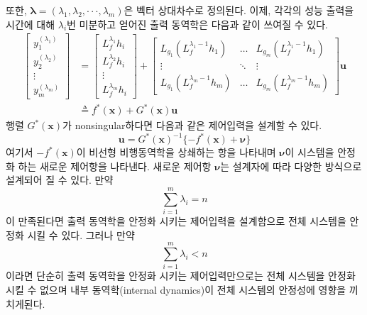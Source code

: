 \documentclass[a4paper, 12pt]{report}
\begin{document}
	또한, $\boldsymbol{\lambda}=(\lambda_{1},\lambda_{2},\cdot\cdot\cdot,\lambda_{m})$은 벡터 상대차수로 정의된다. 이제, 각각의 성능 출력을 시간에 대해 $\lambda_{i}$번 미분하고 얻어진 출력 동역학은 다음과 같이 쓰여질 수 있다.
	\begin{equation}\label{Eq:output_dyn}
		\begin{split}
			\begin{bmatrix}
				y_{1}^{(\lambda_{1})} \\
				y_{2}^{(\lambda_{2})} \\
				\vdots \\
				y_{m}^{(\lambda_{m})}
			\end{bmatrix}
			&=
			\begin{bmatrix}
				L_{f}^{\lambda_{1}}h_{i} \\
				L_{f}^{\lambda_{2}}h_{i} \\
				\vdots \\
				L_{f}^{\lambda_{m}}h_{i}
			\end{bmatrix}
			+
			\begin{bmatrix}
				L_{g_{1}}( L_{f}^{\lambda_{1}-1}h_{1} ) & \dots & L_{g_{m}}( L_{f}^{\lambda_{1}-1}h_{1} ) \\
				\vdots & \ddots & \vdots \\
				L_{g_{1}}( L_{f}^{\lambda_{m}-1}h_{m} ) & \dots & L_{g_{m}}( L_{f}^{\lambda_{m}-1}h_{m} )
			\end{bmatrix}
			\mathbf{u} \\
			&\triangleq f^{*}(\mathbf{x}) + G^{*}(\mathbf{x})\mathbf{u}
		\end{split}
	\end{equation}
	행렬 $G^{*}(\mathbf{x})$가 nonsingular하다면 다음과 같은 제어입력을 설계할 수 있다.
	\begin{equation}\label{Eq:NDI_input1}
		\mathbf{u} = G^{*}(\mathbf{x})^{-1}\{ -f^{*}(\mathbf{x}) + \boldsymbol{\nu} \}
	\end{equation}
	여기서 $-f^{*}(\mathbf{x})$이 비선형 비행동역학을 상쇄하는 항을 나타내며 $\boldsymbol{\nu}$이 시스템을 안정화 하는 새로운 제어항을 나타낸다. 새로운 제어항 $\boldsymbol{\nu}$는 설계자에 따라 다양한 방식으로 설계되어 질 수 있다. 만약
	\begin{equation}\label{Eq:rela_deg_full}
		\sum_{i=1}^{m}\lambda_{i} = n
	\end{equation}
	이 만족된다면 출력 동역학을 안정화 시키는 제어입력을 설계함으로 전체 시스템을 안정화 시킬 수 있다. 그러나 만약
	\begin{equation}
		\sum_{i=1}^{m}\lambda_{i} < n
	\end{equation}
	이라면 단순히 출력 동역학을 안정화 시키는 제어입력만으로는 전체 시스템을 안정화 시킬 수 없으며 내부 동역학(internal dynamics)이 전체 시스템의 안정성에 영향을 끼치게된다.
	
\end{document}
